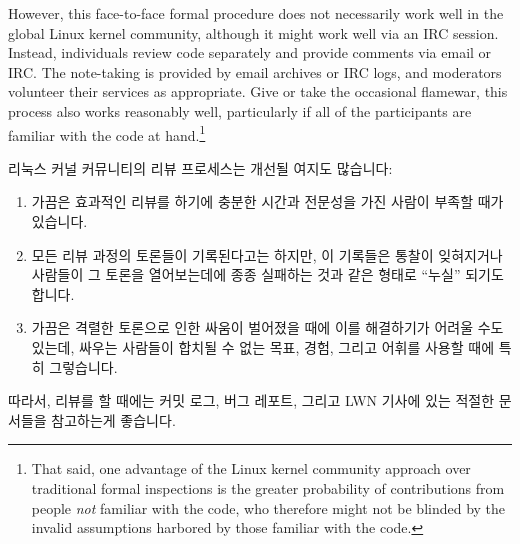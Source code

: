 However, this face-to-face formal procedure does not necessarily
work well in the global Linux kernel community, although it might work
well via an IRC session.
Instead, individuals review code separately and provide comments via
email or IRC.
The note-taking is provided by email archives or IRC logs, and moderators
volunteer their services as appropriate.
Give or take the occasional flamewar, this process also works reasonably
well, particularly if all of the participants are familiar with the
code at hand.\footnote{
	That said, one advantage of the Linux kernel community approach
	over traditional formal inspections is the greater probability of
	contributions from people \emph{not} familiar with the code,
	who therefore might not be blinded by the invalid assumptions
	harbored by those familiar with the code.}
\fi

리눅스 커널 커뮤니티의 리뷰 프로세스는 개선될 여지도 많습니다:

\begin{enumerate}
\item	가끔은 효과적인 리뷰를 하기에 충분한 시간과 전문성을 가진 사람이 부족할
	때가 있습니다.
\item	모든 리뷰 과정의 토론들이 기록된다고는 하지만, 이 기록들은 통찰이
	잊혀지거나 사람들이 그 토론을 열어보는데에 종종 실패하는 것과 같은
	형태로 ``누실'' 되기도 합니다.
\item	가끔은 격렬한 토론으로 인한 싸움이 벌어졌을 때에 이를 해결하기가 어려울
	수도 있는데, 싸우는 사람들이 합치될 수 없는 목표, 경험, 그리고 어휘를
	사용할 때에 특히 그렇습니다.

\end{enumerate}

따라서, 리뷰를 할 때에는 커밋 로그, 버그 레포트, 그리고 LWN 기사에 있는 적절한
문서들을 참고하는게 좋습니다.
\iffalse

